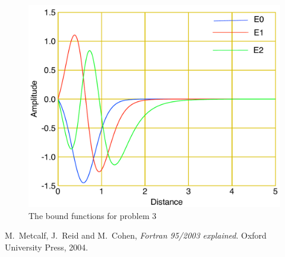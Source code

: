 \documentclass[12pt]{article}
\begin{document}
\begin {figure}[!htb]
	\includegraphics[width=1.\textwidth]{question_3/plot2.pdf}
	\caption{The bound functions for problem 3 }
	\label{image3two}
\end {figure}



\begin{thebibliography}{}


 M.\ Metcalf, J.\ Reid and M.\ Cohen, {\it Fortran 95/2003 explained}. Oxford University Press, 2004.
 

\end{thebibliography}
\end{document}
